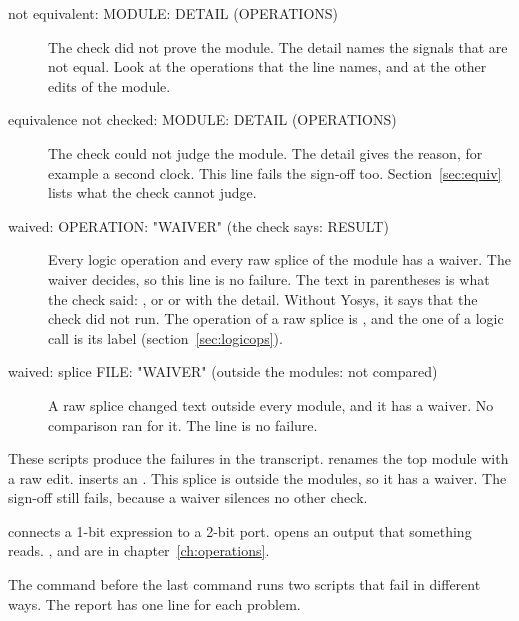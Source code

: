 \begin{description}
\item[not equivalent: MODULE: DETAIL (OPERATIONS)] The check did not prove the module.
  The detail names the signals that are not equal. Look at the operations that the line
  names, and at the other edits of the module.

\item[equivalence not checked: MODULE: DETAIL (OPERATIONS)] The check could not judge the
  module. The detail gives the reason, for example a second clock. This line fails the
  sign-off too. Section~\ref{sec:equiv} lists what the check cannot judge.

\item[waived: OPERATION: "WAIVER" (the check says: RESULT)] Every logic operation and
  every raw splice of the module has a waiver. The waiver decides, so this line is no
  failure. The text in parentheses is what the check said: , or
   or  with the detail. Without Yosys, it says that the check did
  not run. The operation of a raw splice is , and the one of a logic
  call is its label (section~\ref{sec:logicops}).

\item[waived: splice FILE: "WAIVER" (outside the modules: not compared)] A raw splice
  changed text outside every module, and it has a waiver. No comparison ran for it. The
  line is no failure.
\end{description}

These scripts produce the failures in the transcript.  renames the
top module with a raw edit.  inserts an . This splice is
outside the modules, so it has a waiver. The sign-off still fails, because a waiver
silences no other check.

 connects a 1-bit expression to a 2-bit port. 
opens an output that something reads. ,  and
 are in chapter~\ref{ch:operations}.








The command before the last command runs two scripts that fail in different ways. The
report has one line for each problem.

